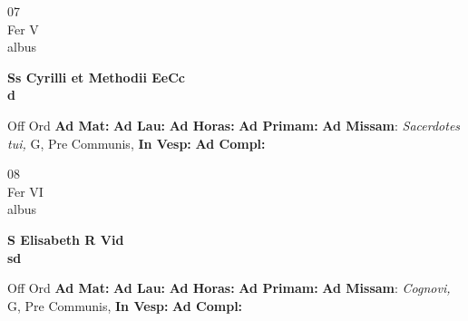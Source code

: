 \documentclass[10pt, openany]{book}
\begin{document}
    \begin{center}
        \begin{minipage}{3.5in}
            \vspace{2em}
            \begin{minipage}{0.5in}
                {\Huge 07} \\
                {\normalsize Fer V} \\
                {\normalsize albus}
            \end{minipage}
            \begin{minipage}{3.0in}
                \textbf{ \large Ss Cyrilli et Methodii EeCc \\
                \textnormal{\normalsize d}} \\ 
            \end{minipage}
            \begin{justify}Off Ord
                \textbf{Ad Mat: }
                \textbf{Ad Lau: }
                \textbf{Ad Horas: }
                \textbf{Ad Primam: }\textbf{Ad Missam}: \textit{Sacerdotes tui,} G, Pre Communis,  
                \textbf{In Vesp: }
                \textbf{Ad Compl: }
            \end{justify}
        \end{minipage}
    \end{center}

    \begin{center}
        \begin{minipage}{3.5in}
            \vspace{2em}
            \begin{minipage}{0.5in}
                {\Huge 08} \\
                {\normalsize Fer VI} \\
                {\normalsize albus}
            \end{minipage}
            \begin{minipage}{3.0in}
                \textbf{ \large S Elisabeth R Vid \\
                \textnormal{\normalsize sd}} \\ 
            \end{minipage}
            \begin{justify}Off Ord
                \textbf{Ad Mat: }
                \textbf{Ad Lau: }
                \textbf{Ad Horas: }
                \textbf{Ad Primam: }\textbf{Ad Missam}: \textit{Cognovi,} G, Pre Communis,  
                \textbf{In Vesp: }
                \textbf{Ad Compl: }
            \end{justify}
        \end{minipage}
    \end{center}
\end{document}
